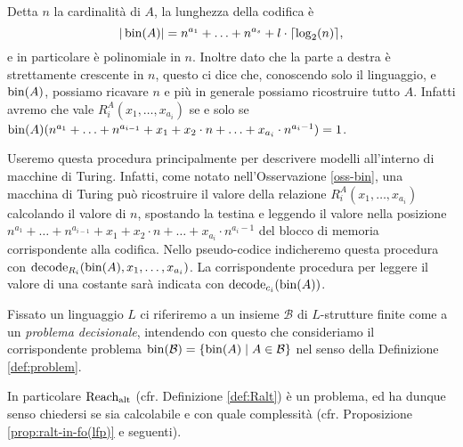 \begin{osservazione}
\label{oss-bin}
 Detta $n$ la cardinalità di $A$, la lunghezza della codifica è
 \[ |\operatorname{bin}(A)|=n^{a_1} + \ldots + n^{a_s} + l \cdot \lceil \log_2(n) \rceil, \]
 e in particolare è polinomiale in $n$. Inoltre dato che la parte a destra è
 strettamente crescente in $n$, questo ci dice che, conoscendo solo il linguaggio,
 e $\operatorname{bin}(A)$, possiamo ricavare $n$ e più in generale possiamo ricostruire tutto $A$.
 Infatti avremo che vale $R_i^A(x_1,\ldots, x_{a_i})$ se e solo se
 $\operatorname{bin}(A)(n^{a_1} + \ldots + n^{a_{i-1}} + x_1 + x_2 \cdot n + \ldots + x_{a_i} \cdot n^{a_i-1}) = 1$.
\end{osservazione}
Useremo questa procedura principalmente per descrivere modelli all'interno
di macchine di Turing. Infatti, come notato nell'Osservazione \ref{oss-bin},
una macchina di Turing può ricostruire
il valore della relazione $R_i^A(x_1, \ldots, x_{a_i})$ calcolando il valore
di $n$, spostando la testina e leggendo il valore nella posizione
$n^{a_1} + \ldots + n^{a_{i-1}} + x_1 + x_2 \cdot n + \ldots + x_{a_i} \cdot n^{a_i-1}$
del blocco di memoria corrispondente alla codifica.
Nello pseudo-codice indicheremo questa procedura con
$\operatorname{decode}_{R_i}(\operatorname{bin}(A), x_1, \ldots, x_{a_i})$. La corrispondente procedura per
leggere il valore di una costante sarà indicata con $\operatorname{decode}_{c_i} (\operatorname{bin}(A))$.

\begin{definizione}
Fissato un linguaggio $L$ ci riferiremo a un insieme $\mathcal{B}$ di $L$-strutture finite
come a un \emph{problema decisionale}, intendendo con questo che consideriamo il corrispondente
problema $\operatorname{bin}(\mathcal{B}) = \{\operatorname{bin}(A) \mid A \in \mathcal{B}\}$ nel senso della Definizione \ref{def:problem}.
\end{definizione}
In particolare $\operatorname{Reach_{alt}}$ (cfr. Definizione \ref{def:Ralt}) è un problema, ed ha
dunque senso chiedersi se sia calcolabile e con quale complessità
(cfr. Proposizione \ref{prop:ralt-in-fo(lfp)} e seguenti).